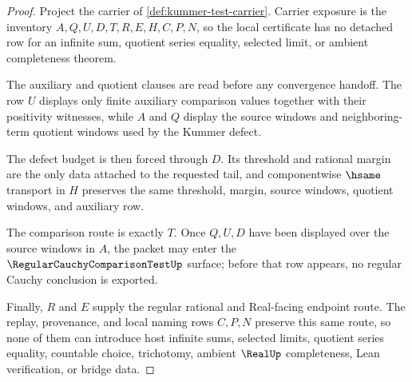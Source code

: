 \begin{proof}
Project the carrier of \autoref{def:kummer-test-carrier}. Carrier exposure is the inventory $A,Q,U,D,T,R,E,H,C,P,N$, so the local certificate has no detached row for an infinite sum, quotient series equality, selected limit, or ambient completeness theorem.

The auxiliary and quotient clauses are read before any convergence handoff. The row $U$ displays only finite auxiliary comparison values together with their positivity witnesses, while $A$ and $Q$ display the source windows and neighboring-term quotient windows used by the Kummer defect.

The defect budget is then forced through $D$. Its threshold and rational margin are the only data attached to the requested tail, and componentwise $\hsame$ transport in $H$ preserves the same threshold, margin, source windows, quotient windows, and auxiliary row.

The comparison route is exactly $T$. Once $Q,U,D$ have been displayed over the source windows in $A$, the packet may enter the $\RegularCauchyComparisonTestUp$ surface; before that row appears, no regular Cauchy conclusion is exported.

Finally, $R$ and $E$ supply the regular rational and Real-facing endpoint route. The replay, provenance, and local naming rows $C,P,N$ preserve this same route, so none of them can introduce host infinite sums, selected limits, quotient series equality, countable choice, trichotomy, ambient $\RealUp$ completeness, Lean verification, or bridge data.
\end{proof}

